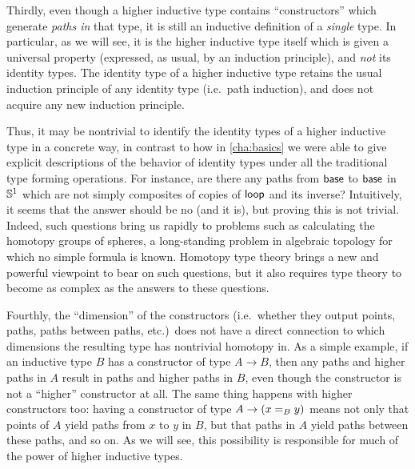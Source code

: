 Thirdly, even though a higher inductive type contains ``constructors'' which generate \emph{paths in} that type, it is still an inductive definition of a \emph{single} type.
In particular, as we will see, it is the higher inductive type itself which is given a universal property (expressed, as usual, by an induction principle), and \emph{not} its identity types.
The identity type of a higher inductive type retains the usual induction principle of any identity type (i.e.\ path induction), and does not acquire any new induction principle.

Thus, it may be nontrivial to identify the identity types of a higher inductive type in a concrete way, in contrast to how in \autoref{cha:basics} we were able to give explicit descriptions of the behavior of identity types under all the traditional type forming operations.
For instance, are there any paths from $\base$ to $\base$ in $\Sn^1$ which are not simply composites of copies of $\lloop$ and its inverse?
Intuitively, it seems that the answer should be no (and it is), but proving this is not trivial.
Indeed, such questions bring us rapidly to problems such as calculating the homotopy groups of spheres, a long-standing problem in algebraic topology for which no simple formula is known.
Homotopy type theory brings a new and powerful viewpoint to bear on such questions, but it also requires type theory to become as complex as the answers to these questions.

Fourthly, the ``dimension'' of the constructors (i.e.\ whether they output points, paths, paths between paths, etc.)\ does not have a direct connection to which dimensions the resulting type has nontrivial homotopy in.
As a simple example, if an inductive type $B$ has a constructor of type $A\to B$, then any paths and higher paths in $A$ result in paths and higher paths in $B$, even though the constructor is not a ``higher'' constructor at all.
The same thing happens with higher constructors too: having a constructor of type $A\to (\id[B]xy)$ means not only that points of $A$ yield paths from $x$ to $y$ in $B$, but that paths in $A$ yield paths between these paths, and so on.
As we will see, this possibility is responsible for much of the power of higher inductive types.

